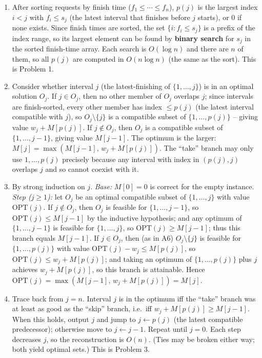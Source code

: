 \documentclass[11pt]{article}
\begin{document}
\begin{enumerate}[label=\textbf{A\arabic*.}, leftmargin=2.2em]
\item After sorting requests by finish time ($f_1 \le \cdots \le f_n$), $p(j)$ is the
largest index $i < j$ with $f_i \le s_j$ (the latest interval that finishes before $j$
starts), or $0$ if none exists. Since finish times are sorted, the set $\{ i : f_i \le s_j
\}$ is a prefix of the index range, so its largest element can be found by \textbf{binary
search} for $s_j$ in the sorted finish-time array. Each search is $O(\log n)$ and there are
$n$ of them, so all $p(j)$ are computed in $O(n \log n)$ (the same as the sort). This is
Problem 1.

\item Consider whether interval $j$ (the latest-finishing of $\{1,\ldots,j\}$) is in an
optimal solution $O_j$. If $j \in O_j$, then no other member of $O_j$ overlaps $j$; since
intervals are finish-sorted, every other member has index $\le p(j)$ (the latest interval
compatible with $j$), so $O_j \setminus \{j\}$ is a compatible subset of $\{1,\ldots,p(j)\}$
-- giving value $w_j + M[p(j)]$. If $j \notin O_j$, then $O_j$ is a compatible subset of
$\{1,\ldots,j-1\}$, giving value $M[j-1]$. The optimum is the larger: $M[j] = \max(M[j-1],
\, w_j + M[p(j)])$. The ``take'' branch may only use $1,\ldots,p(j)$ precisely because any
interval with index in $(p(j), j)$ overlaps $j$ and so cannot coexist with it.

\item By strong induction on $j$. \emph{Base:} $M[0] = 0$ is correct for the empty
instance. \emph{Step ($j \ge 1$):} let $O_j$ be an optimal compatible subset of
$\{1,\ldots,j\}$ with value $\mathrm{OPT}(j)$. If $j \notin O_j$, then $O_j$ is feasible for
$\{1,\ldots,j-1\}$, so $\mathrm{OPT}(j) \le M[j-1]$ by the inductive hypothesis; and any
optimum of $\{1,\ldots,j-1\}$ is feasible for $\{1,\ldots,j\}$, so $\mathrm{OPT}(j) \ge
M[j-1]$; thus this branch equals $M[j-1]$. If $j \in O_j$, then (as in A6) $O_j \setminus
\{j\}$ is feasible for $\{1,\ldots,p(j)\}$ with value $\mathrm{OPT}(j) - w_j \le M[p(j)]$,
so $\mathrm{OPT}(j) \le w_j + M[p(j)]$; and taking an optimum of $\{1,\ldots,p(j)\}$ plus
$j$ achieves $w_j + M[p(j)]$, so this branch is attainable. Hence $\mathrm{OPT}(j) =
\max(M[j-1],\, w_j + M[p(j)]) = M[j]$.

\item Trace back from $j = n$. Interval $j$ is in the optimum iff the ``take'' branch was at
least as good as the ``skip'' branch, i.e.\ iff $w_j + M[p(j)] \ge M[j-1]$. When this
holds, output $j$ and jump to $j \gets p(j)$ (the latest compatible predecessor); otherwise
move to $j \gets j-1$. Repeat until $j = 0$. Each step decreases $j$, so the reconstruction
is $O(n)$. (Ties may be broken either way; both yield optimal sets.) This is Problem 3.


\end{enumerate}
\end{document}
